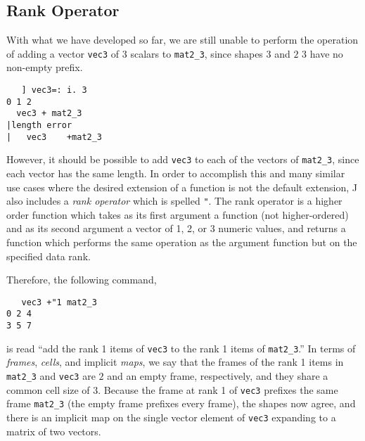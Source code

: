 \subsection{Rank Operator}
With what we have developed so far, we are still unable to perform the operation of 
adding a vector \texttt{vec3} of 3 scalars to \texttt{mat2\_3}, since shapes $3$ and $2$ $3$ have no non-empty prefix.

\begin{singlespacing}
\begin{small}
\begin{verbatim}
   ] vec3=: i. 3
0 1 2
  vec3 + mat2_3
|length error
|   vec3    +mat2_3
\end{verbatim}
\end{small}
\end{singlespacing}

However, it should be possible to add \texttt{vec3} to each of the vectors of \texttt{mat2\_3}, since each vector has the same length.
In order to accomplish this and many similar use cases where the desired extension of a function is not the default extension, 
J also includes a \textit{rank operator} which is spelled \texttt{"}.
The rank operator is a higher order function which takes as its first argument a function (not higher-ordered) %
and as its second argument a vector of 1, 2, or 3 numeric values, 
and returns a function which performs the same operation as the argument function but on the specified data rank\cite{rankanduni}.

Therefore, the following command, 

\begin{singlespacing}
\begin{small}
\begin{verbatim}
   vec3 +"1 mat2_3
0 2 4
3 5 7
\end{verbatim}
\end{small}
\end{singlespacing}

is read ``add the rank 1 items of \texttt{vec3} to the rank 1 items of \texttt{mat2\_3}.''
In terms of \textit{frames}, \textit{cells}, and implicit \textit{maps}, we say that
the frames of the rank 1 items in \texttt{mat2\_3} and \texttt{vec3} are $2$ and an empty frame, respectively, and they share a common cell size of $3$.
Because the frame at rank 1 of \texttt{vec3} prefixes the same frame \texttt{mat2\_3} (the empty frame prefixes every frame), 
the shapes now agree, and there is an implicit map on the single vector element of \texttt{vec3} expanding to a matrix of two vectors.

